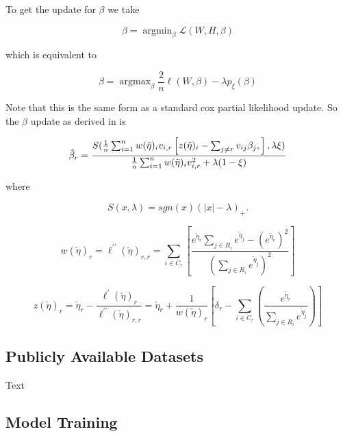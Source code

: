 \documentclass[9pt,twocolumn,twoside,]{pnas-new}
\begin{document}
To get the update for \(\beta\) we take

\begin{equation}
    \beta = \mathop{\mathrm{argmin}}_\beta \mathcal{L}(W,H,\beta)
\end{equation}

which is equivalent to

\begin{equation}
    \beta = \mathop{\mathrm{argmax}}_\beta \frac{2}{n}\ell(W,\beta) - \lambda p_{\xi}(\beta)
\end{equation}

Note that this is the same form as a standard cox partial likelihood
update. So the \(\beta\) update as derived in
\cite{simon2011regularization} is

\begin{equation}
    \hat{\beta}_r = \frac{S(\frac{1}{n}\sum_{i=1}^n w(\Tilde{\eta})_i v_{i,r} \left[ z(\Tilde{\eta})_i - \sum_{j\ne r} v_{ij} \beta_j,\right], \lambda\xi)}{\frac{1}{n}\sum_{i=1}^n w(\Tilde{\eta})_i v_{i,r}^2 + \lambda(1-\xi)}
\end{equation}

where

\begin{equation}
    S(x,\lambda)=sgn(x)(|x|-\lambda)_+.
\end{equation}

\begin{equation}
w(\tilde{\eta})_{r}=\ell^{\prime \prime}(\tilde{\eta})_{r, r}=\sum_{i \in C_{r}}\left[\frac{e^{\tilde{\eta}_{r}} \sum_{j \in R_{i}} e^{\tilde{\eta}_{j}}-\left(e^{\tilde{\eta}_{r}}\right)^{2}}{\left(\sum_{j \in R_{i}} e^{\tilde{\eta}_{j}}\right)^{2}}\right] 
\end{equation}

\begin{equation}
    z(\tilde{\eta})_{r}=\tilde{\eta}_{r}-\frac{\ell^{\prime}(\tilde{\eta})_{r}}{\ell^{\prime \prime}(\tilde{\eta})_{r, r}}=\tilde{\eta}_{r}+\frac{1}{w(\tilde{\eta})_{r}}\left[\delta_{r}-\sum_{i \in C_{r}}\left(\frac{e^{\tilde{\eta}_{r}}}{\sum_{j \in R_{i}} e^{\tilde{\eta}_{j}}}\right)\right]
\end{equation}

\subsection{Publicly Available Datasets}

Text

\subsection{Model Training}
\end{document}
